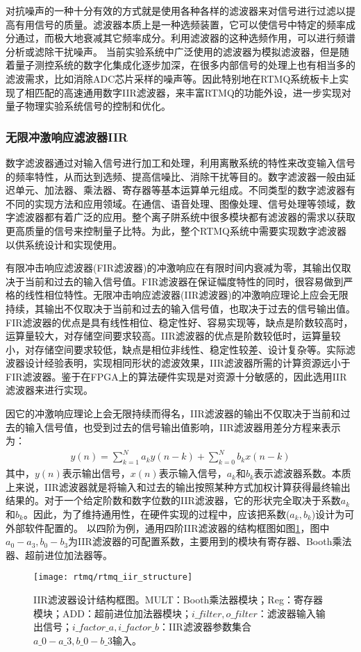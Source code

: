 对抗噪声的一种十分有效的方式就是使用各种各样的滤波器来对信号进行过滤以提高有用信号的质量。滤波器本质上是一种选频装置，它可以使信号中特定的频率成分通过，而极大地衰减其它频率成分。利用滤波器的这种选频作用，可以进行频谱分析或滤除干扰噪声。
当前实验系统中广泛使用的滤波器为模拟滤波器，但是随着量子测控系统的数字化集成化逐步加深，在很多内部信号的处理上也有相当多的滤波需求，比如消除ADC芯片采样的噪声等。因此特别地在RTMQ系统板卡上实现了相匹配的高速通用数字IIR滤波器，来丰富RTMQ的功能外设，进一步实现对量子物理实验系统信号的控制和优化。


\subsubsection[无限冲激响应滤波器IIR]{无限冲激响应滤波器IIR}
数字滤波器通过对输入信号进行加工和处理，利用离散系统的特性来改变输入信号的频率特性，从而达到选频、提高信噪比、消除干扰等目的。数字滤波器一般由延迟单元、加法器、乘法器、寄存器等基本运算单元组成。不同类型的数字滤波器有不同的实现方法和应用领域。在通信、语音处理、图像处理、信号处理等领域，数字滤波器都有着广泛的应用。整个离子阱系统中很多模块都有滤波器的需求以获取更高质量的信号来控制量子比特。为此，整个RTMQ系统中需要实现数字滤波器以供系统设计和实现使用。

有限冲击响应滤波器(FIR滤波器)的冲激响应在有限时间内衰减为零，其输出仅取决于当前和过去的输入信号值。FIR滤波器在保证幅度特性的同时，很容易做到严格的线性相位特性。无限冲击响应滤波器(IIR滤波器)的冲激响应理论上应会无限持续，其输出不仅取决于当前和过去的输入信号值，也取决于过去的信号输出值。
FIR滤波器的优点是具有线性相位、稳定性好、容易实现等，缺点是阶数较高时，运算量较大，对存储空间要求较高。IIR滤波器的优点是阶数较低时，运算量较小，对存储空间要求较低，缺点是相位非线性、稳定性较差、设计复杂等。实际滤波器设计经验表明，实现相同形状的滤波效果，IIR滤波器所需的计算资源远小于FIR滤波器。鉴于在FPGA上的算法硬件实现是对资源十分敏感的，因此选用IIR滤波器来进行实现。

因它的冲激响应理论上会无限持续而得名，IIR滤波器的输出不仅取决于当前和过去的输入信号值，也受到过去的信号输出值影响，IIR滤波器用差分方程来表示为：
\begin{align}
    y(n)=\sum_{k=1}^Na_ky(n-k)+\sum_{k=0}^Nb_kx(n-k)\label{eq:iir_filter}
\end{align}
其中，$y(n)$表示输出信号，$x(n)$表示输入信号，$a_k$和$b_k$表示滤波器系数。本质上来说，IIR滤波器就是将输入和过去的输出按照某种方式加权计算获得最终输出结果的。对于一个给定阶数和数字位数的IIR滤波器，它的形状完全取决于系数$a_k$和$b_k$。因此，为了维持通用性，在硬件实现的过程中，应该把系数($a_k, b_k$)设计为可外部软件配置的。
以四阶为例，通用四阶IIR滤波器的结构框图如图\ref{fig:rtmq_iir_structure}，图中$a_0-a_3, b_0-b_3$为IIR滤波器的可配置系数，主要用到的模块有寄存器、Booth乘法器、超前进位加法器等。
\begin{figure}
    \centering
    \texttt{[image: rtmq/rtmq\_iir\_structure]}
    \caption[IIR滤波器设计结构框图]{IIR滤波器设计结构框图。MULT：Booth乘法器模块；Reg：寄存器模块；ADD：超前进位加法器模块；$i\_filter, o\_filter$：滤波器输入输出信号；$i\_factor\_a,i\_factor\_b$：IIR滤波器参数集合$a\_0-a\_3, b\_0-b\_3$输入。\label{fig:rtmq_iir_structure}}
\end{figure}


